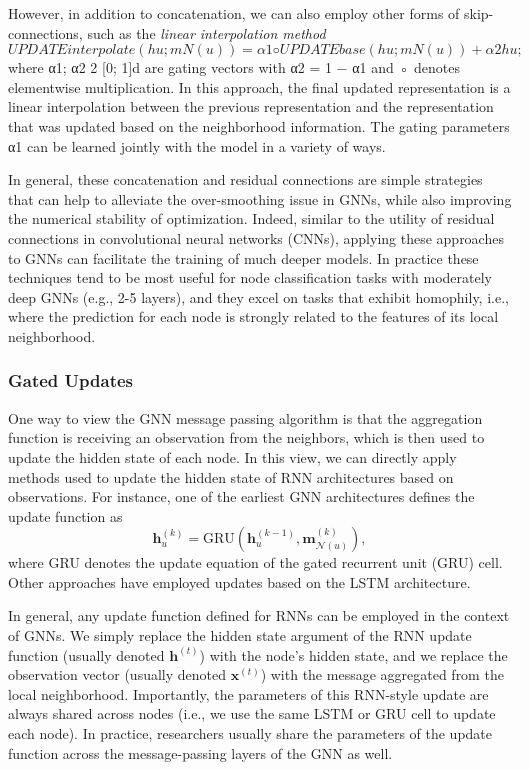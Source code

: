 \documentclass[10pt]{book}
\let\defaultmarginpar\marginpar
\renewcommand\marginpar[2][]{\defaultmarginpar{\itshape\color{gray}#2}}
\begin{document}
However, in addition to concatenation, we can also employ other forms of skip-connections, such as the \emph{linear interpolation method}\marginpar{linear interpolation method}
\begin{equation}
    UPDATEinterpolate(hu; mN(u)) = α1 ◦ UPDATEbase(hu; mN(u)) + α2 hu;
\end{equation}
where α1; α2 2 [0; 1]d are gating vectors with α2 = 1 − α1 and ◦ denotes elementwise multiplication. In this approach, the final updated representation is a linear interpolation between the previous representation and the representation that was updated based on the neighborhood information. The gating parameters α1 can be learned jointly with the model in a variety of ways.

In general, these concatenation and residual connections are simple strategies that can help to alleviate the over-smoothing issue in GNNs, while also improving the numerical stability of optimization. Indeed, similar to the utility of residual connections in convolutional neural networks (CNNs), applying these approaches to GNNs can facilitate the training of much deeper models. In practice these techniques tend to be most useful for node classification tasks with moderately deep GNNs (e.g., 2-5 layers), and they excel on tasks that exhibit homophily, i.e., where the prediction for each node is
strongly related to the features of its local neighborhood.

\subsubsection{Gated Updates}

One way to view the GNN message passing algorithm is that the aggregation function is receiving an observation from the neighbors, which is then used to update the hidden state of each node. In this view, we can directly apply methods used to update the hidden state of RNN architectures based on observations. For instance, one of the earliest GNN architectures defines the update function as
\begin{equation}
    \mathbf h^{(k)}_u = \text{GRU}(\mathbf h_u^{(k-1)}, \mathbf m^{(k)}_{\mathcal N(u)}),
\end{equation}
where GRU denotes the update equation of the gated recurrent unit (GRU) cell. Other approaches have employed updates based on the
LSTM architecture.

In general, any update function defined for RNNs can be employed in the context of GNNs. We simply replace the hidden state argument of the RNN update function (usually denoted $\mathbf h^{(t)}$) with the node’s hidden state, and we replace the observation vector (usually denoted $\mathbf x^{(t)}$) with the message aggregated from the local neighborhood. Importantly, the parameters of this RNN-style update are always shared across nodes (i.e., we use the same LSTM or GRU cell to update each node). In practice, researchers usually share the parameters of the update function across the message-passing layers of the GNN as well.
\end{document}

